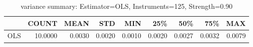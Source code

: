 \begin{table}[ht]
\centering
\caption{variance summary: Estimator=OLS, Instruments=125, Strength=0.90}
\begin{tabular}{lrrrrrrrr}
\toprule
 & COUNT & MEAN & STD & MIN & 25\% & 50\% & 75\% & MAX \\
\midrule
OLS & 10.0000 & 0.0030 & 0.0020 & 0.0010 & 0.0020 & 0.0027 & 0.0032 & 0.0079 \\
\bottomrule
\end{tabular}
\end{table}
